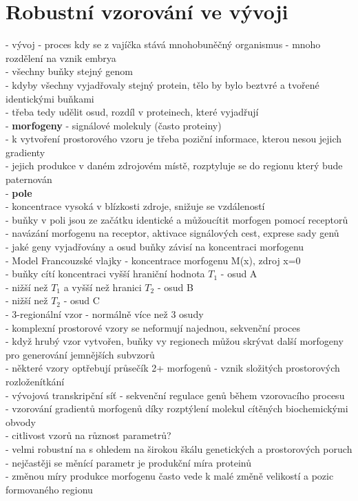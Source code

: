 \documentclass[11pt,a4paper]{report}
\begin{document}
\chapter{Robustní vzorování ve vývoji}
- vývoj - proces kdy se z vajíčka stává mnohobuněčný organismus - mnoho rozdělení na vznik embrya\\
- všechny buňky stejný genom\\
\indent - kdyby všechny vyjadřovaly stejný protein, tělo by bylo beztvré a tvořené identickými buňkami\\
\indent - třeba tedy udělit osud, rozdíl v proteinech, které vyjadřují\\
- \textbf{morfogeny} - signálové molekuly (často proteiny)\\
\indent - k vytvoření prostorového vzoru je třeba poziční informace, kterou nesou jejich gradienty\\
\indent - jejich produkce v daném zdrojovém místě, rozptyluje se do regionu který bude paternován\\
\indent \indent - \textbf{pole}\\
\indent - koncentrace vysoká v blízkosti zdroje, snižuje se vzdáleností\\
\indent - buňky v poli jsou ze začátku identické a můžoucítit morfogen pomocí receptorů\\
\indent \indent - navázání morfogenu na receptor, aktivace signálových cest, exprese sady genů\\
\indent \indent \indent - jaké geny vyjadřovány a osud buňky závisí na koncentraci morfogenu\\
- Model Francouzské vlajky - koncentrace morfogenu M(x), zdroj x=0\\
\indent - buňky cítí koncentraci vyšší hraniční hodnota $T_1$ - osud A\\
\indent - nižší než $T_1$ a vyšší než hranici $T_2$ - osud B\\
\indent - nižší než $T_2$ - osud C\\
\indent - 3-regionální vzor - normálně více než 3 osudy\\
- komplexní prostorové vzory se neformují najednou, sekvenční proces\\
- když hrubý vzor vytvořen, buňky vy regionech můžou skrývat další morfogeny pro generování jemnějších subvzorů\\
- některé vzory optřebují průsečík 2+ morfogenů - vznik složitých prostorových rozloženítkání\\
- vývojová transkripční síť - sekvenční regulace genů během vzorovacího procesu\\
- vzorování gradientů morfogenů díky rozptýlení molekul cítěných biochemickými obvody\\
\indent - citlivost vzorů na různost parametrů?\\
\indent - velmi robustní na s ohledem na širokou škálu genetických a prostorových poruch\\
\indent - nejčastěji se měnící parametr je produkční míra proteinů\\
\indent - změnou míry produkce morfogenu často vede k malé změně velikostí a pozic formovaného regionu\\
\end{document}
